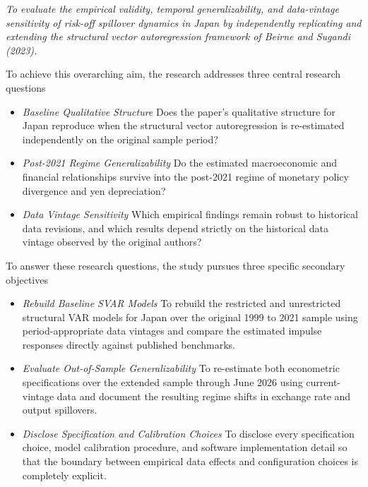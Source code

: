 \vspace{1em}
\noindent\textit{To evaluate the empirical validity, temporal generalizability, and data-vintage sensitivity of risk-off spillover dynamics in Japan by independently replicating and extending the structural vector autoregression framework of Beirne and Sugandi (2023).}
\vspace{1em}

To achieve this overarching aim, the research addresses three central research questions

\begin{itemize}
    \item \textit{Baseline Qualitative Structure}
\newline Does the paper's qualitative structure for Japan reproduce when the structural vector autoregression is re-estimated independently on the original sample period?
    \item \textit{Post-2021 Regime Generalizability}
\newline Do the estimated macroeconomic and financial relationships survive into the post-2021 regime of monetary policy divergence and yen depreciation?
    \item \textit{Data Vintage Sensitivity}
\newline Which empirical findings remain robust to historical data revisions, and which results depend strictly on the historical data vintage observed by the original authors?
\end{itemize}

To answer these research questions, the study pursues three specific secondary objectives

\begin{itemize}
    \item \textit{Rebuild Baseline SVAR Models}
\newline To rebuild the restricted and unrestricted structural VAR models for Japan over the original 1999 to 2021 sample using period-appropriate data vintages and compare the estimated impulse responses directly against published benchmarks.
    \item \textit{Evaluate Out-of-Sample Generalizability}
\newline To re-estimate both econometric specifications over the extended sample through June 2026 using current-vintage data and document the resulting regime shifts in exchange rate and output spillovers.
    \item \textit{Disclose Specification and Calibration Choices}
\newline To disclose every specification choice, model calibration procedure, and software implementation detail so that the boundary between empirical data effects and configuration choices is completely explicit.
\end{itemize}

